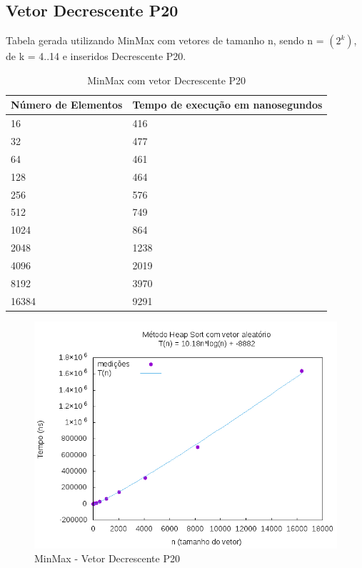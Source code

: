 \documentclass[12pt,a4paper,twoside]{report}
\begin{document}
\subsection{Vetor Decrescente P20}
Tabela gerada utilizando MinMax com vetores de tamanho n, sendo n = $(2^k)$, de k = 4..14 e inseridos Decrescente P20.
\begin{table}[H]
\centering
\caption{MinMax com vetor Decrescente P20}
\label{my-label}
\begin{tabular}{|l|l|}
\hline
\multicolumn{1}{|c|}{\textbf{Número de Elementos}} & \multicolumn{1}{c|}{\textbf{Tempo de execução em nanosegundos}} \\ \hline
16 & 416 \\ \hline
32 & 477 \\ \hline
64 & 461 \\ \hline
128 & 464 \\ \hline
256 & 576 \\ \hline
512 & 749 \\ \hline
1024 & 864 \\ \hline
2048 & 1238 \\ \hline
4096 & 2019 \\ \hline
8192 & 3970 \\ \hline
16384 & 9291 \\ \hline
\end{tabular}
\end{table}

\begin{figure}[H]
    \centering
    \includegraphics[width=0.7\linewidth]{graficos/HeapSort/vIntAleatorio/vIntAleatorio.png}
  \caption{MinMax - Vetor Decrescente P20}
\end{figure}
\end{document}
